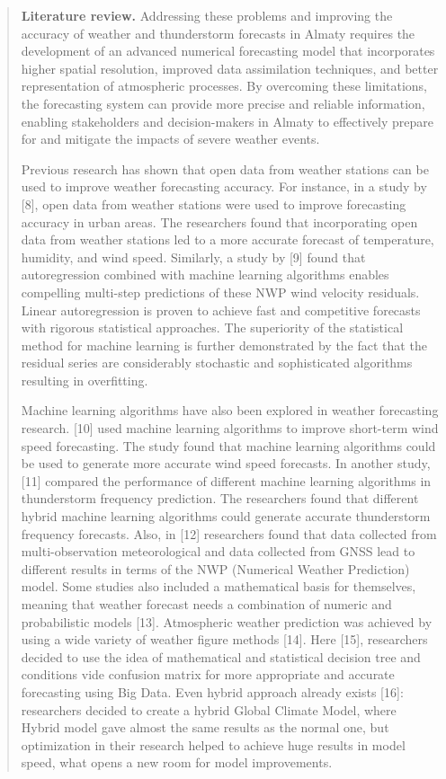 \begin{quote}
{\bfseries Literature review.} Addressing these problems and improving the
accuracy of weather and thunderstorm forecasts in Almaty requires the
development of an advanced numerical forecasting model that incorporates
higher spatial resolution, improved data assimilation techniques, and
better representation of atmospheric processes. By overcoming these
limitations, the forecasting system can provide more precise and
reliable information, enabling stakeholders and decision-makers in
Almaty to effectively prepare for and mitigate the impacts of severe
weather events.

Previous research has shown that open data from weather stations can be
used to improve weather forecasting accuracy. For instance, in a study
by {[}8{]}, open data from weather stations were used to improve
forecasting accuracy in urban areas. The researchers found that
incorporating open data from weather stations led to a more accurate
forecast of temperature, humidity, and wind speed. Similarly, a study by
{[}9{]} found that autoregression combined with machine learning
algorithms enables compelling multi-step predictions of these NWP wind
velocity residuals. Linear autoregression is proven to achieve fast and
competitive forecasts with rigorous statistical approaches. The
superiority of the statistical method for machine learning is further
demonstrated by the fact that the residual series are considerably
stochastic and sophisticated algorithms resulting in overfitting.

Machine learning algorithms have also been explored in weather
forecasting research. {[}10{]} used machine learning algorithms to
improve short-term wind speed forecasting. The study found that machine
learning algorithms could be used to generate more accurate wind speed
forecasts. In another study, {[}11{]} compared the performance of
different machine learning algorithms in thunderstorm frequency
prediction. The researchers found that different hybrid machine learning
algorithms could generate accurate thunderstorm frequency forecasts.
Also, in {[}12{]} researchers found that data collected from
multi-observation meteorological and data collected from GNSS lead to
different results in terms of the NWP (Numerical Weather Prediction)
model. Some studies also included a mathematical basis for themselves,
meaning that weather forecast needs a combination of numeric and
probabilistic models {[}13{]}. Atmospheric weather prediction was
achieved by using a wide variety of weather figure methods {[}14{]}.
Here {[}15{]}, researchers decided to use the idea of mathematical and
statistical decision tree and conditions vide confusion matrix for more
appropriate and accurate forecasting using Big Data. Even hybrid
approach already exists {[}16{]}: researchers decided to create a hybrid
Global Climate Model, where Hybrid model gave almost the same results as
the normal one, but optimization in their research helped to achieve
huge results in model speed, what opens a new room for model
improvements.


\end{quote}
